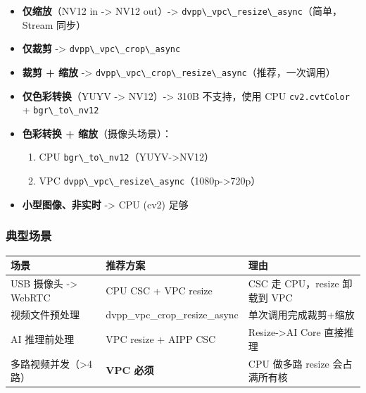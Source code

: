 \begin{itemize}
\tightlist
\item
  \textbf{仅缩放}（NV12 in -\textgreater{} NV12 out）-\textgreater{}
  \passthrough{\lstinline!dvpp\_vpc\_resize\_async!}（简单，Stream
  同步）
\item
  \textbf{仅裁剪} -\textgreater{}
  \passthrough{\lstinline!dvpp\_vpc\_crop\_async!}
\item
  \textbf{裁剪 + 缩放} -\textgreater{}
  \passthrough{\lstinline!dvpp\_vpc\_crop\_resize\_async!}（推荐，一次调用）
\item
  \textbf{仅色彩转换}（YUYV -\textgreater{} NV12）-\textgreater{} 310B
  不支持，使用 CPU \passthrough{\lstinline!cv2.cvtColor!} +
  \passthrough{\lstinline!bgr\_to\_nv12!}
\item
  \textbf{色彩转换 + 缩放}（摄像头场景）：

  \begin{enumerate}
  \def\labelenumi{\arabic{enumi}.}
  \tightlist
  \item
    CPU
    \passthrough{\lstinline!bgr\_to\_nv12!}（YUYV-\textgreater NV12）
  \item
    VPC
    \passthrough{\lstinline!dvpp\_vpc\_resize\_async!}（1080p-\textgreater720p）
  \end{enumerate}
\item
  \textbf{小型图像、非实时} -\textgreater{} CPU (cv2) 足够
\end{itemize}

\subsubsection{典型场景}\label{src-book-chapter6-h111}

\begin{longtable}[]{@{}
  >{\raggedright\arraybackslash}p{}
  >{\raggedright\arraybackslash}p{}
  >{\raggedright\arraybackslash}p{}@{}}
\toprule\noalign{}
\begin{minipage}[b]{\linewidth}\raggedright
场景
\end{minipage} & \begin{minipage}[b]{\linewidth}\raggedright
推荐方案
\end{minipage} & \begin{minipage}[b]{\linewidth}\raggedright
理由
\end{minipage} \\
\midrule\noalign{}
\endhead
\bottomrule\noalign{}
\endlastfoot
USB 摄像头 -\textgreater{} WebRTC & CPU CSC + VPC resize & CSC 走
CPU，resize 卸载到 VPC \\
视频文件预处理 & dvpp\_vpc\_crop\_resize\_async &
单次调用完成裁剪+缩放 \\
AI 推理前处理 & VPC resize + AIPP CSC & Resize-\textgreater AI Core
直接推理 \\
多路视频并发（\textgreater4 路） & \textbf{VPC 必须} & CPU 做多路 resize
会占满所有核 \\
\end{longtable}

